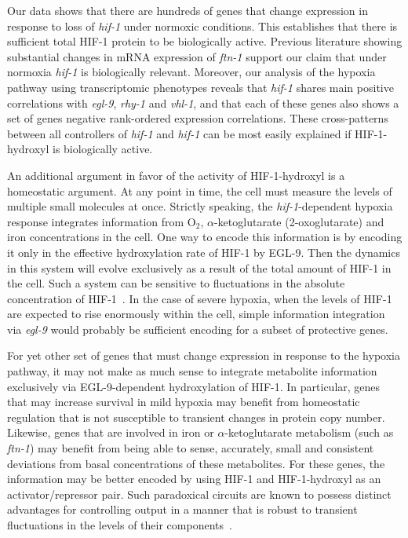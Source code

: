 \documentclass[9pt,twocolumn,twoside]{pnas-new}
\newcommand{\ftna}{\emph{ftn-1}}
\newcommand{\egl}{\emph{egl-9}}
\newcommand{\rhy}{\emph{rhy-1}}
\newcommand{\vhl}{\emph{vhl-1}}
\newcommand{\hif}{\emph{hif-1}}
\newcommand{\eglp}{EGL-9}
\newcommand{\hifp}{HIF-1}
\begin{document}
Our data shows that there are hundreds of genes that change expression in response
to loss of \hif{} under normoxic conditions. This establishes that there is sufficient
total \hifp{} protein to be biologically active. Previous literature showing
substantial changes in mRNA expression of \ftna{} support our claim that under
normoxia \hif{} is biologically relevant. Moreover, our analysis of the
hypoxia pathway using transcriptomic phenotypes reveals that \hif{} shares main
positive correlations with \egl{}, \rhy{} and \vhl{}, and that each of these genes
also shows a set of genes negative rank-ordered expression correlations. These
cross-patterns between all controllers of \hif{} and \hif{} can be most easily
explained if \hifp{}-hydroxyl is biologically active.

An additional argument in favor of the activity of \hifp{}-hydroxyl is a
homeostatic argument. At any point in time, the cell must measure the levels of
multiple small molecules at once. Strictly speaking, the \hif{}-dependent hypoxia
response integrates information from O$_2$, $\alpha$-ketoglutarate
(2-oxoglutarate) and iron concentrations in the cell. One way to encode this
information is by encoding it only in the effective hydroxylation rate of \hifp{} by
\eglp{}. Then the dynamics in this system will evolve exclusively as a result of
the total amount of \hifp{} in the cell. Such a system can be sensitive to
fluctuations in the absolute concentration of \hifp{}~\cite{Goentoro2009a}. In the
case of severe hypoxia, when the levels of \hifp{} are expected to rise enormously
within the cell, simple information integration via \egl{} would probably be
sufficient encoding for a subset of protective genes.

For yet other set of genes that must change expression in response to the hypoxia
pathway, it may not make as much sense to integrate metabolite information
exclusively via \eglp{}-dependent hydroxylation of \hifp{}. In particular, genes
that may increase survival in mild hypoxia may benefit from homeostatic regulation
that is not susceptible to transient changes in protein copy number. Likewise,
genes that are involved in iron or $\alpha$-ketoglutarate metabolism
(such as \ftna{}) may benefit from being able to sense, accurately, small and
consistent deviations from basal concentrations of these metabolites. For these
genes, the information may be better encoded by using \hifp{} and
\hifp{}-hydroxyl as an activator/repressor pair. Such paradoxical circuits are
known to possess distinct advantages for controlling output in a manner that
is robust to transient fluctuations in the levels of their
components~\cite{Hart2012,Hart2013}.
\end{document}
